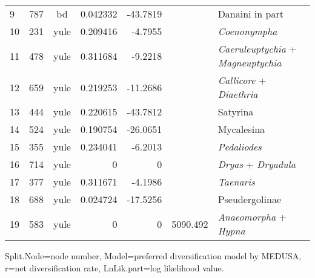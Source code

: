 \documentclass[10pt]{article}
\begin{document}
\begin{table}[!h]
\begin{tabular}{lccrrcl}
9               & 787        & bd    & 0.042332   & -43.7819   &          & Danaini in part                                            \\
10              & 231        & yule  & 0.209416   & -4.7955    &          & \emph{Coenonympha}                                         \\
11              & 478        & yule  & 0.311684   & -9.2218    &          & \emph{Caeruleuptychia} + \emph{Magneuptychia}              \\
12              & 659        & yule  & 0.219253   & -11.2686   &          & \emph{Callicore} + \emph{Diaethria}                        \\
13              & 444        & yule  & 0.220615   & -43.7812   &          & Satyrina                                                   \\
14              & 524        & yule  & 0.190754   & -26.0651   &          & Mycalesina                                                 \\
15              & 355        & yule  & 0.234041   & -6.2013    &          & \emph{Pedaliodes}                                          \\
16              & 714        & yule  & 0          & 0          &          & \emph{Dryas} + \emph{Dryadula}                             \\
17              & 377        & yule  & 0.311671   & -4.1986    &          & \emph{Taenaris}                                            \\
18              & 688        & yule  & 0.024724   & -17.5256   &          & Pseudergolinae                                             \\
19              & 583        & yule  & 0          & 0          & 5090.492 & \emph{Anaeomorpha} + \emph{Hypna}                                       
\end{tabular}
\begin{flushleft}Split.Node=node number, Model=preferred diversification model by MEDUSA, r=net diversification rate, LnLik.part=log likelihood value.
\end{flushleft}
\end{table}
\end{document}
